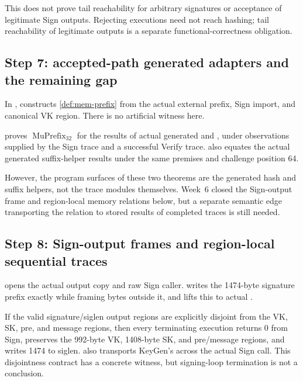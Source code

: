 This does not prove tail reachability for arbitrary signatures or acceptance of
legitimate Sign outputs. Rejecting executions need not reach hashing; tail
reachability of legitimate outputs is a separate functional-correctness obligation.

\subsection{Step 7: accepted-path generated adapters and the remaining gap}

In ,
 constructs
\cref{def:mem-prefix} from the actual external prefix, Sign import, and canonical
VK region. There is no artificial  witness here.

\begin{verified}
\label{thm:accepted-api-adapter}
 proves
\(\operatorname{MuPrefix}_{32}\) for the results of actual generated
 and , under observations
supplied by the Sign trace and a successful Verify trace.
also equates the actual generated suffix-helper results under the same premises
and challenge position 64.
\end{verified}

However, the program surfaces of these two theorems are the generated hash and
suffix helpers, not the trace modules themselves. Week~6 closed the Sign-output
frame and region-local memory relations below, but a separate semantic edge
transporting the relation to stored results of completed traces is still needed.

\subsection{Step 8: Sign-output frames and region-local sequential traces}

 opens the actual output copy and raw Sign
caller.  writes the
1474-byte signature prefix exactly while framing bytes outside it, and
 lifts this to actual
.

\begin{verified}
\label{thm:sign-output-frame}
If the valid signature/siglen output regions are explicitly disjoint from the
VK, SK, pre, and message regions, then every terminating execution returns 0
from Sign, preserves the 992-byte VK, 1408-byte SK, and pre/message regions,
and writes 1474 to siglen.
 also transports
KeyGen's  across the actual Sign call. This
disjointness contract has a concrete witness, but signing-loop termination is
not a conclusion.
\end{verified}

